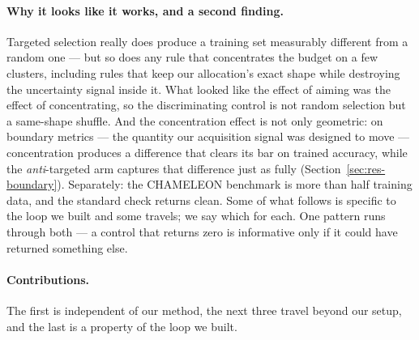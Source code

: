 \documentclass{article} %
\begin{document}
\paragraph{Why it looks like it works, and a second finding.} Targeted selection really does produce
a training set measurably different from a random one --- but so does any rule that concentrates the
budget on a few clusters, including rules that keep our allocation's exact shape while destroying
the uncertainty signal inside it. What looked like the effect of aiming was the effect of
concentrating, so the discriminating control is not random selection but a same-shape shuffle.
And the concentration effect is not only geometric: on boundary metrics --- the quantity our
acquisition signal was designed to move --- concentration produces a difference that clears its bar
on trained accuracy, while the \emph{anti}-targeted arm captures that difference just as fully
(Section~\ref{sec:res-boundary}). Separately: the CHAMELEON benchmark is more than half training
data, and the standard check returns clean. Some of what follows is specific to the loop we built
and some travels; we say which for each. One pattern runs through both --- a control that returns
zero is informative only if it could have returned something else.

\paragraph{Contributions.} The first is independent of our method, the next three travel beyond our
setup, and the last is a property of the loop we built.
\end{document}

